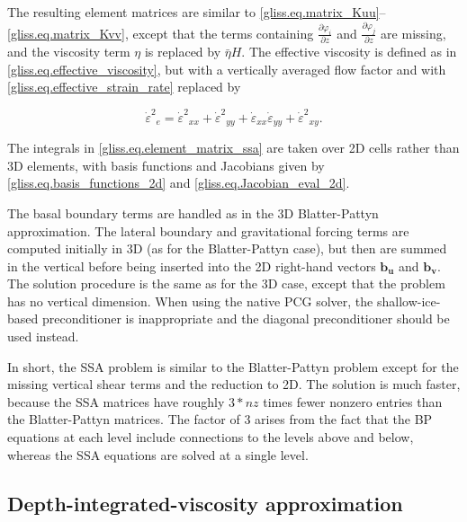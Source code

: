 {\noindent
The resulting element matrices are similar to \eqref{gliss.eq.matrix_Kuu}--\eqref{gliss.eq.matrix_Kvv},
except that the terms containing $\frac{\partial {{\varphi }_{i}}}{\partial z}$ and
$\frac{\partial {{\varphi }_{j}}}{\partial z}$ are missing, and the viscosity term $\eta$
is replaced by $\bar{\eta} H$.  The effective viscosity is defined as in \eqref{gliss.eq.effective_viscosity},
but with a vertically averaged flow factor and with \eqref{gliss.eq.effective_strain_rate} replaced by

\begin{equation}
  \label{gliss.eq.effective_strain_rate_ssa}
        {{\dot{\varepsilon }}^{2}}_{e} = 
        {{\dot{\varepsilon }}^{2}}_{xx} + {{\dot{\varepsilon }}^{2}}_{yy} + 
        {{\dot{\varepsilon }}_{xx}}{{\dot{\varepsilon }}_{yy}} + {{\dot{\varepsilon }}^{2}}_{xy}.
\end{equation}

\noindent
The integrals in \eqref{gliss.eq.element_matrix_ssa} are taken over 2D cells rather than 3D elements,
with basis functions and Jacobians given by \eqref{gliss.eq.basis_functions_2d}
and \eqref{gliss.eq.Jacobian_eval_2d}.

The basal boundary terms are handled as in the 3D Blatter-Pattyn approximation. 
The lateral boundary and gravitational forcing terms are computed initially in 3D
(as for the Blatter-Pattyn case), but then are summed in the vertical before being
inserted into the 2D right-hand vectors $\mathbf{b_u}$ and $\mathbf{b_v}$.  The solution procedure
is the same as for the 3D case, except that the problem has no vertical dimension.
When using the native PCG solver, the shallow-ice-based preconditioner is inappropriate
and the diagonal preconditioner should be used instead.  

In short, the SSA problem is similar to the Blatter-Pattyn problem except for the
missing vertical shear terms and the reduction to 2D.  The solution is much faster, because the SSA matrices
have roughly $3*nz$ times fewer nonzero entries than the Blatter-Pattyn matrices.
The factor of 3 arises from the fact that the BP equations at each level include
connections to the levels above and below, whereas the SSA equations
are solved at a single level.


\subsection{Depth-integrated-viscosity approximation}
\label{sc:DIVA}

}
